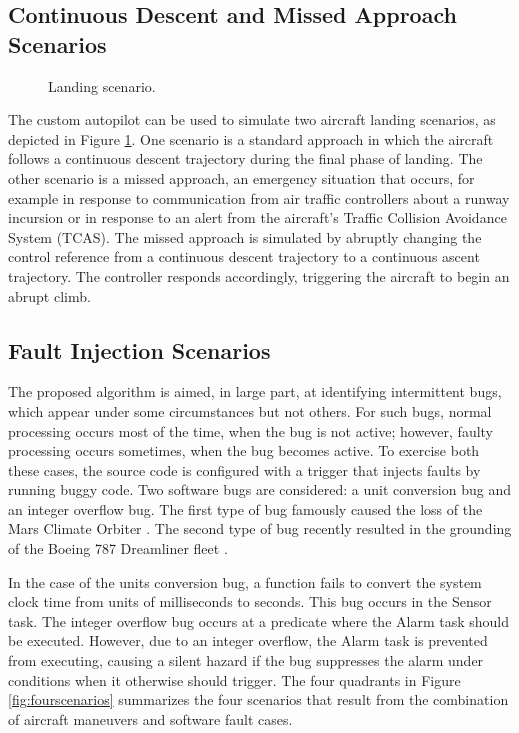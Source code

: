 \subsection{Continuous Descent and Missed Approach Scenarios}

\begin{figure}[h]
  \caption{Landing scenario.}
  \label{fig:landing}
\end{figure}

The custom autopilot can be used to simulate two aircraft landing
scenarios, as depicted in Figure \ref{fig:landing}. One scenario
is a standard approach in which the aircraft follows a continuous
descent trajectory during the final phase of landing.  The other
scenario is a missed approach, an emergency situation that occurs, for
example in response to communication from air traffic controllers
about a runway incursion or in response to an alert from the
aircraft's Traffic Collision Avoidance System (TCAS). The missed
approach is simulated by abruptly changing the control reference from
a continuous descent trajectory to a continuous ascent trajectory. The
controller responds accordingly, triggering the aircraft to begin an
abrupt climb.

\subsection{Fault Injection Scenarios}
The proposed algorithm is aimed, in large part, at identifying
intermittent bugs, which appear under some circumstances but not
others.  For such bugs, normal processing occurs most of the time,
when the bug is not active; however, faulty processing occurs
sometimes, when the bug becomes active.  To exercise both these cases,
the source code is configured with a trigger that injects faults by
running buggy code.  Two software bugs are considered:  a unit
conversion bug and an integer overflow bug.  The first type of bug
famously caused the loss of the Mars Climate Orbiter \cite{wiki:mars}.
The second type of bug recently resulted in the grounding of the
Boeing 787 Dreamliner fleet  \cite{boeing_bug}.

In the case of the units conversion bug, a function fails to convert
the system clock time from units of milliseconds to seconds.  This bug occurs in
the Sensor task. The integer overflow bug occurs at a predicate where
the Alarm task should be executed. However, due to an integer
overflow, the Alarm task is prevented from executing, causing a silent
hazard if the bug suppresses the alarm under conditions when it
otherwise should trigger. The four quadrants in Figure \ref{fig:fourscenarios}
summarizes the four scenarios that result from the combination of
aircraft maneuvers and software fault cases.

